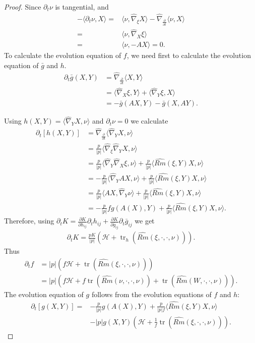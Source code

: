 \documentclass{amsart}
\theoremstyle{definition}
\theoremstyle{remark}
\numberwithin{equation}{section}
\begin{document}
\begin{proof}
Since $\partial_t \nu$ is tangential, and
\begin{align*}
-\langle \partial_t\nu,X\rangle=&\langle \nu,\hat{\nabla}_{\xi}X\rangle-\hat{\nabla}_{\frac{\partial}{\partial t}}\langle \nu,X \rangle \\
=&\langle \nu,\hat{\nabla}_{X}\xi\rangle\\
=&\langle \nu,-AX\rangle=0.
\end{align*}
To calculate the evolution equation of $ f $, we need first to calculate the evolution equation of $\bar{g}$ and $h.$
\begin{align*}
\partial_t \bar{g}(X,Y)&=\hat{\nabla}_{\frac{\partial}{\partial t}}\langle X,Y\rangle\\
&=\langle \hat{\nabla}_X\xi,Y\rangle+\langle \hat{\nabla}_Y\xi,X\rangle\\
&=-\bar{g}( AX,Y)-\bar{g}(X,AY).
\end{align*}



Using $h(X,Y)=\langle \hat{\nabla}_{Y}X, \nu\rangle$ and $\partial_t\nu=0$ we calculate
\begin{align*}
\partial_t [h(X,Y)] &= \hat{\nabla}_{\frac{\partial}{\partial t}}\langle \hat{\nabla}_{Y}X,\nu\rangle\\
&=\frac{p}{|p|}\langle \hat{\nabla}_{\xi}\hat{\nabla}_{Y}X,\nu\rangle\\
&=\frac{p}{|p|}\langle \hat{\nabla}_{Y}\hat{\nabla}_{X}\xi,\nu\rangle+ \frac{p}{|p|}\langle \widehat{Rm}(\xi,Y)X,\nu\rangle\\
&=-\frac{p}{|p|}\langle \hat{\nabla}_{Y}AX,\nu\rangle+ \frac{p}{|p|}\langle \widehat{Rm}(\xi,Y)X,\nu\rangle\\
&=\frac{p}{|p|}\langle AX,\hat{\nabla}_{Y}\nu\rangle+ \frac{p}{|p|}\langle \widehat{Rm}(\xi,Y)X,\nu\rangle\\
&=-\frac{p}{|p|} f  g(A(X),Y)+\frac{p}{|p|}\langle \widehat{Rm}(\xi,Y)X,\nu\rangle.
\end{align*}
Therefore, using $\partial_t K=\frac{\partial K}{\partial h_{ij}}\partial_th_{ij}+\frac{\partial K}{\partial \bar{g}_{ij}}\partial_t\bar{g}_{ij}$ we get
\begin{align*}
\partial_tK=\frac{pK}{|p|}(\mathcal{H}+\operatorname{tr}_h (\widehat{Rm}(\xi,\cdot,\cdot,\nu))).
\end{align*}
Thus
\begin{align}
 \partial_tf&=|p|(f\mathcal{H}+\operatorname{tr} (\widehat{Rm}(\xi,\cdot,\cdot,\nu)))\nonumber\\
&= |p|(f\mathcal{H}+f\operatorname{tr} (\widehat{Rm}(\nu,\cdot,\cdot,\nu))+\operatorname{tr} (\widehat{Rm}(W,\cdot,\cdot,\nu))).
\end{align}
The evolution equation of $g$ follows from the evolution equations of $ f $ and $h:$
\begin{align*}
\partial_t [g(X,Y)] = &-\frac{p}{|p|}g(A(X),Y)+\frac{p}{|p|f}\langle \widehat{Rm}(\xi,Y)X,\nu\rangle\\
&-
|p|g(X,Y)(\mathcal{H}+\frac{1}{f}\operatorname{tr} (\widehat{Rm}(\xi,\cdot,\cdot,\nu))).
\end{align*}


\end{proof}
\end{document}
